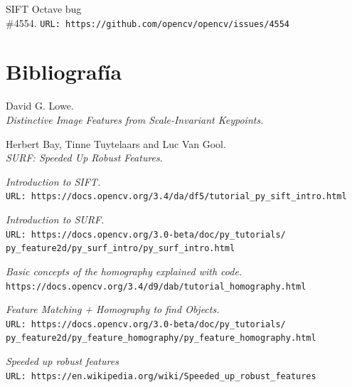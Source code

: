 \documentclass[12pt,spanish]{article} %
\begin{document}
\noindent
[1] SIFT Octave bug
\\
{\#}4554. \texttt{URL: https://github.com/opencv/opencv/issues/4554}


\section{Bibliografía}

\noindent
David G. Lowe.
\\
\textit{Distinctive Image Features from Scale-Invariant Keypoints}.

\noindent
Herbert Bay, Tinne Tuytelaars and Luc Van Gool.
\\
\textit{SURF: Speeded Up Robust Features}.

\noindent
\textit{Introduction to SIFT.}
\\
\texttt{URL: https://docs.opencv.org/3.4/da/df5/tutorial\_py\_sift\_intro.html}

\noindent
\textit{Introduction to SURF.}
\\
\texttt{URL: https://docs.opencv.org/3.0-beta/doc/py\_tutorials/}
\\
\texttt{py\_feature2d/py\_surf\_intro/py\_surf\_intro.html}

\noindent
\textit{Basic concepts of the homography explained with code.}
\\
\texttt{https://docs.opencv.org/3.4/d9/dab/tutorial\_homography.html}

\noindent
\textit{Feature Matching + Homography to find Objects.}
\\
\texttt{URL: https://docs.opencv.org/3.0-beta/doc/py\_tutorials/}
\\
\texttt{py\_feature2d/py\_feature\_homography/py\_feature\_homography.html}

\noindent
\textit{Speeded up robust features}
\\
\texttt{URL: https://en.wikipedia.org/wiki/Speeded\_up\_robust\_features}

\end{document}
